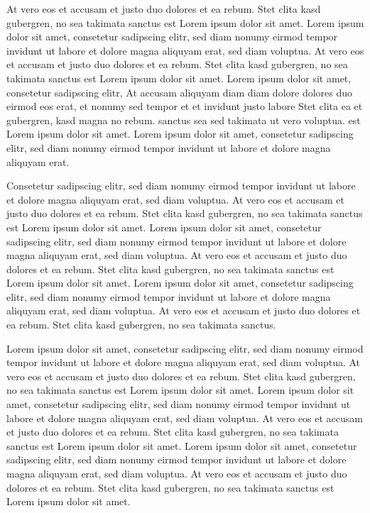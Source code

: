 \documentclass[]{../metanetpaper}
\begin{document}
\begin{Parallel}[c]{80mm}{80mm}
{    At vero eos et accusam et justo duo dolores et ea rebum. Stet clita kasd gubergren, no sea takimata sanctus est Lorem ipsum dolor sit amet. Lorem ipsum dolor sit amet, consetetur sadipscing elitr, sed diam nonumy eirmod tempor invidunt ut labore et dolore magna aliquyam erat, sed diam voluptua. At vero eos et accusam et justo duo dolores et ea rebum. Stet clita kasd gubergren, no sea takimata sanctus est Lorem ipsum dolor sit amet. Lorem ipsum dolor sit amet, consetetur sadipscing elitr, At accusam aliquyam diam diam dolore dolores duo eirmod eos erat, et nonumy sed tempor et et invidunt justo labore Stet clita ea et gubergren, kasd magna no rebum. sanctus sea sed takimata ut vero voluptua. est Lorem ipsum dolor sit amet. Lorem ipsum dolor sit amet, consetetur sadipscing elitr, sed diam nonumy eirmod tempor invidunt ut labore et dolore magna aliquyam erat.   

    Consetetur sadipscing elitr, sed diam nonumy eirmod tempor invidunt ut labore et dolore magna aliquyam erat, sed diam voluptua. At vero eos et accusam et justo duo dolores et ea rebum. Stet clita kasd gubergren, no sea takimata sanctus est Lorem ipsum dolor sit amet. Lorem ipsum dolor sit amet, consetetur sadipscing elitr, sed diam nonumy eirmod tempor invidunt ut labore et dolore magna aliquyam erat, sed diam voluptua. At vero eos et accusam et justo duo dolores et ea rebum. Stet clita kasd gubergren, no sea takimata sanctus est Lorem ipsum dolor sit amet. Lorem ipsum dolor sit amet, consetetur sadipscing elitr, sed diam nonumy eirmod tempor invidunt ut labore et dolore magna aliquyam erat, sed diam voluptua. At vero eos et accusam et justo duo dolores et ea rebum. Stet clita kasd gubergren, no sea takimata sanctus.   

    Lorem ipsum dolor sit amet, consetetur sadipscing elitr, sed diam nonumy eirmod tempor invidunt ut labore et dolore magna aliquyam erat, sed diam voluptua. At vero eos et accusam et justo duo dolores et ea rebum. Stet clita kasd gubergren, no sea takimata sanctus est Lorem ipsum dolor sit amet. Lorem ipsum dolor sit amet, consetetur sadipscing elitr, sed diam nonumy eirmod tempor invidunt ut labore et dolore magna aliquyam erat, sed diam voluptua. At vero eos et accusam et justo duo dolores et ea rebum. Stet clita kasd gubergren, no sea takimata sanctus est Lorem ipsum dolor sit amet. Lorem ipsum dolor sit amet, consetetur sadipscing elitr, sed diam nonumy eirmod tempor invidunt ut labore et dolore magna aliquyam erat, sed diam voluptua. At vero eos et accusam et justo duo dolores et ea rebum. Stet clita kasd gubergren, no sea takimata sanctus est Lorem ipsum dolor sit amet.   

}
\end{Parallel}
\end{document}
